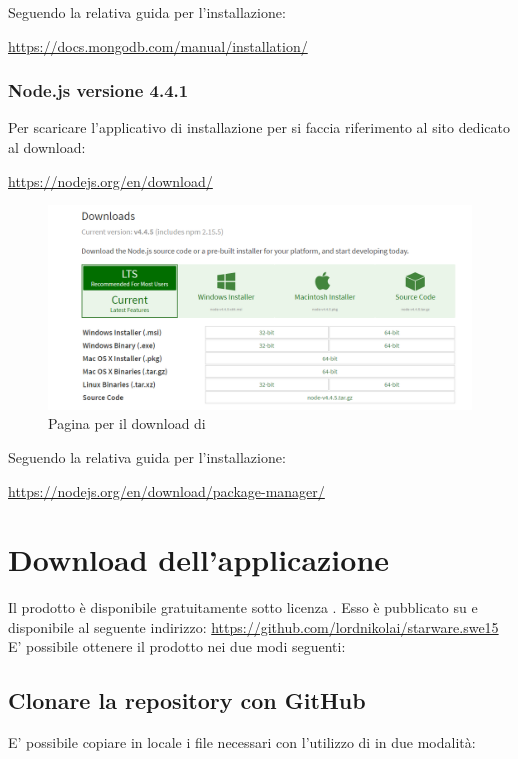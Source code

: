 \documentclass[12pt,a4paper]{article}
\begin{document}
	Seguendo la relativa guida per l'installazione:
		\begin{center} \url{https://docs.mongodb.com/manual/installation/}
		\end{center}
	
	\subsubsection{Node.js versione 4.4.1}
		Per scaricare l'applicativo di installazione per  si faccia riferimento al sito dedicato al download:
		\begin{center}
			 \url{https://nodejs.org/en/download/} 
		\end{center}
			\begin{figure}[H]	
				\centering
				\includegraphics[width=1.0\linewidth]{../img/manualeInstallazione/nodeDownloadCenter.png}
				\caption{Pagina per il download di }
				\label{Pagina per il download di node.js}
			\end{figure}
		Seguendo la relativa guida per l'installazione:
		\begin{center} \url{https://nodejs.org/en/download/package-manager/}
		\end{center}
	
	\newpage
	\section{Download dell'applicazione}\label{download}
	Il prodotto è disponibile gratuitamente sotto  licenza \licenza. Esso è pubblicato su  e disponibile al seguente indirizzo: \url{https://github.com/lordnikolai/starware.swe15}
	E' possibile ottenere il prodotto nei due modi seguenti:
	\subsection{Clonare la repository con GitHub}
	E' possibile copiare in locale i file necessari con l'utilizzo di  in due modalità:
	
\end{document}
